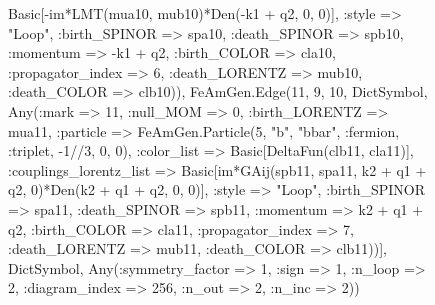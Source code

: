 \documentclass{revtex4}
\begin{document}
\begin{figure}[!htb]
\begin{center}
{Basic[-im*LMT(mua10, mub10)*Den(-k1 + q2, 0, 0)], :style => "Loop", :birth_SPINOR => spa10, :death_SPINOR => spb10, :momentum => -k1 + q2, :birth_COLOR => cla10, :propagator_index => 6, :death_LORENTZ => mub10, :death_COLOR => clb10)), FeAmGen.Edge(11, 9, 10, Dict{Symbol, Any}(:mark => 11, :null_MOM => 0, :birth_LORENTZ => mua11, :particle => FeAmGen.Particle(5, "b", "bbar", :fermion, :triplet, -1//3, 0, 0), :color_list => Basic[DeltaFun(clb11, cla11)], :couplings_lorentz_list => Basic[im*GAij(spb11, spa11, k2 + q1 + q2, 0)*Den(k2 + q1 + q2, 0, 0)], :style => "Loop", :birth_SPINOR => spa11, :death_SPINOR => spb11, :momentum => k2 + q1 + q2, :birth_COLOR => cla11, :propagator_index => 7, :death_LORENTZ => mub11, :death_COLOR => clb11))], Dict{Symbol, Any}(:symmetry_factor => 1, :sign => 1, :n_loop => 2, :diagram_index => 256, :n_out => 2, :n_inc => 2)) 
}
\end{center}
\end{figure}
\end{document}
